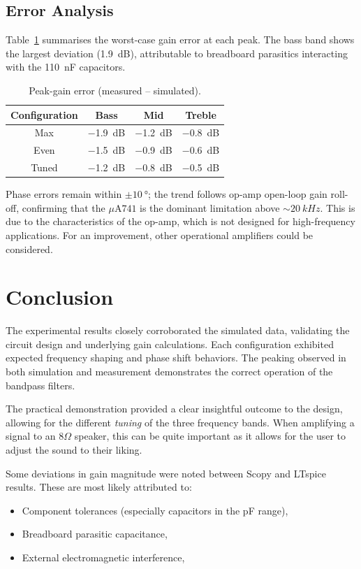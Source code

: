 \documentclass[12pt]{article}
\begin{document}
\subsection{Error Analysis}
Table~\ref{tab:error} summarises the worst-case gain error at each peak.  The
bass band shows the largest deviation (\SI{1.9}{dB}), attributable to breadboard
parasitics interacting with the \SI{110}{nF} capacitors.

\begin{table}[H]
	\centering
	\begin{tabular}{|c|c|c|c|}
		\hline
		Configuration & Bass          & Mid           & Treble        \\
		\hline
		Max           & \SI{-1.9}{dB} & \SI{-1.2}{dB} & \SI{-0.8}{dB} \\
		Even          & \SI{-1.5}{dB} & \SI{-0.9}{dB} & \SI{-0.6}{dB} \\
		Tuned         & \SI{-1.2}{dB} & \SI{-0.8}{dB} & \SI{-0.5}{dB} \\
		\hline
	\end{tabular}
	\caption{Peak-gain error (measured – simulated).}
	\label{tab:error}
\end{table}

Phase errors remain within \(\pm\SI{10}{\degree}\); the trend follows
op-amp open-loop gain roll-off, confirming that the \(\mu\text{A}741\) is the
dominant limitation above \(\sim\SI{20}{kHz}\). This is due to the
characteristics of the op-amp, which is not designed for high-frequency
applications. For an improvement, other operational amplifiers could be
considered.


\section{Conclusion}
The experimental results closely corroborated the simulated data, validating the circuit design and underlying gain calculations. Each configuration exhibited expected frequency shaping and phase shift behaviors. The peaking observed in both simulation and measurement demonstrates the correct operation of the bandpass filters.

The practical demonstration provided a clear insightful outcome to the design,
allowing for the different \textit{tuning} of the three frequency bands. When
amplifying a signal to an $8\Omega$ speaker, this can be quite important as it
allows for the user to adjust the sound to their liking.

Some deviations in gain magnitude were noted between Scopy and LTspice results. These are most likely attributed to:
\begin{itemize}
	\item Component tolerances (especially capacitors in the pF range),
	\item Breadboard parasitic capacitance,
	\item External electromagnetic interference,
\end{itemize}
\end{document}
